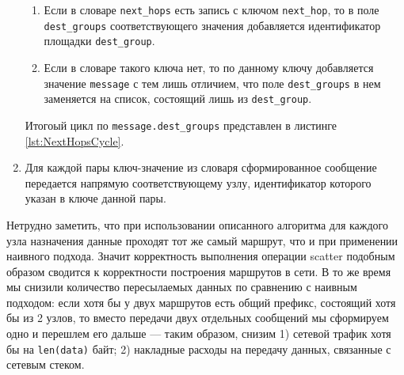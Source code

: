 \documentclass{article}
\theoremstyle{plain}
\theoremstyle{plain}
\theoremstyle{plain}
\theoremstyle{plain}
\theoremstyle{definition}
\theoremstyle{remark}
\theoremstyle{plain}
\begin{document}
\begin{enumerate}
\begin{enumerate}
        \item Если в словаре \texttt{next\_hops} есть запись с ключом \texttt{next\_hop}, то в поле \texttt{dest\_groups} соответствующего значения добавляется идентификатор площадки \texttt{dest\_group}.
        
        \item Если в словаре такого ключа нет, то по данному ключу добавляется значение \texttt{message} с тем лишь отличием, что поле \texttt{dest\_groups} в нем заменяется на список, состоящий лишь из \texttt{dest\_group}.
    \end{enumerate}
    
    Итогоый цикл по \texttt{message.dest\_groups} представлен в листинге \ref{lst:NextHopsCycle}.
    
        
    \item Для каждой пары ключ-значение из словаря сформированное сообщение передается напрямую соответствующему узлу, идентификатор которого указан в ключе данной пары.
\end{enumerate}

Нетрудно заметить, что при использовании описанного алгоритма для каждого узла назначения данные проходят тот же самый маршрут, что и при применении наивного подхода. Значит корректность выполнения операции scatter подобным образом сводится к корректности построения маршрутов в сети. В то же время мы снизили количество пересылаемых данных по сравнению с наивным подходом: если хотя бы у двух маршрутов есть общий префикс, состоящий хотя бы из 2 узлов, то вместо передачи двух отдельных сообщений мы сформируем одно и перешлем его дальше --- таким образом, снизим 1) сетевой трафик хотя бы на \texttt{len(data)} байт; 2) накладные расходы на передачу данных, связанные с сетевым стеком.
\end{document}
